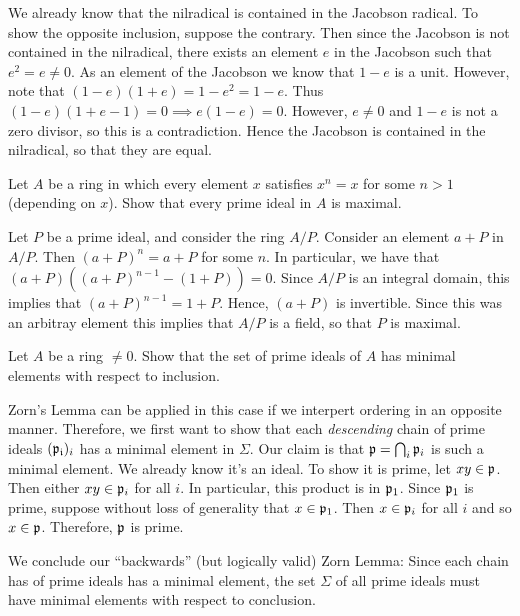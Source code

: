 \documentclass[10pt]{amsart}
\begin{document}
\begin{solution}
    We already know that the nilradical is contained in the Jacobson radical. 
    To show the opposite inclusion, suppose the contrary. Then since the Jacobson 
    is not contained in the nilradical, there exists an element $e$ in the Jacobson such 
    that $e^2 = e \ne 0$. As an element of the Jacobson we know that 
    $1 - e$ is a unit. However, note that $(1 - e)(1 + e) = 1 - e^2 = 1 - e$. 
    Thus $(1 - e)(1 + e - 1) = 0 \implies e(1 - e) = 0$. However, $e \ne 0$ and 
    $1 - e$ is not a zero divisor, so this is a contradiction. Hence the Jacobson is 
    contained in the nilradical, so that they are equal. 
\end{solution}

\begin{exercise}
    Let $A$ be a ring in which every element $x$ satisfies $x^n = x$ for some $n > 1$ (depending on $x$). Show that every prime ideal in $A$ 
    is maximal.
\end{exercise}

\begin{solution}
    Let $P$ be a prime ideal, and consider the ring $A/P$. Consider an element 
    $a + P$ in $A/P$. Then $(a + P)^n = a + P$ for some $n$. In particular, we have that 
    $(a + P)((a + P)^{n-1} - (1 + P)) = 0$. Since $A/P$ is an integral domain, this implies that 
    $(a + P)^{n-1} = 1 + P$. Hence, $(a + P)$ is invertible. Since this was an arbitray element 
    this implies that $A/P$ is a field, so that $P$ is maximal.
\end{solution}

\begin{exercise}
    Let $A$ be a ring $\ne 0$. Show that the set of prime ideals of $A$ has minimal 
    elements with respect to inclusion.
\end{exercise}

\begin{solution}
    Zorn's Lemma can be applied in this case if we interpert ordering in an opposite manner.
    Therefore, we first want to show that each \emph{descending} chain of prime 
    ideals $(\mathfrak{p_i})_i$ has a minimal element in $\Sigma$. Our claim is that 
    $\mathfrak{p} = \bigcap_{i} \mathfrak{p}_i$ is such a minimal element. We already know it's an ideal. To show it is 
    prime, let $xy \in \mathfrak{p}$. Then either $xy \in \mathfrak{p}_i$ for all $i$. In particular, this product 
    is in $\mathfrak{p}_1$. Since $\mathfrak{p}_1$ is prime, suppose without loss of generality that 
    $x \in \mathfrak{p}_1$. Then $x \in \mathfrak{p}_i$ for all $i$ and so $x \in \mathfrak{p}$. Therefore, $\mathfrak{p}$ is prime. 

    We conclude our ``backwards'' (but logically valid) Zorn Lemma: Since each chain has of prime ideals 
    has a minimal element, the set $\Sigma$ of all prime ideals must have minimal elements with respect to conclusion. 
    
\end{solution}
\end{document}
